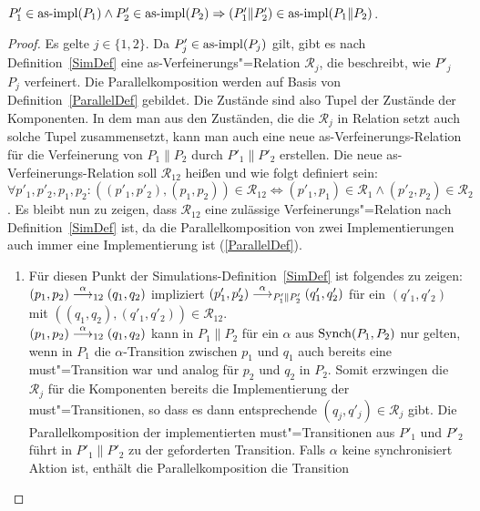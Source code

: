 \begin{Lem}\mbox{}\\
  \label{impParallelLem}
  $P'_1\in\mathrm{as}\text{-}\mathrm{impl} (P_1) \land P'_2 \in\mathrm{as}\text{-}\mathrm{impl} (P_2) \Rightarrow (P'_1\|P'_2)
  \in\mathrm{as}\text{-}\mathrm{impl} (P_1\|P_2)$.
\end{Lem}

\begin{proof}
  Es gelte $j\in\{1,2\}$. Da $P'_j\in\mathrm{as}\text{-}\mathrm{impl} (P_j)$ gilt, gibt es nach
  Definition~\ref{SimDef} eine as-Verfeinerungs"=Relation $\mathcal{R}_j$, die
  beschreibt, wie $P'_j$ $P_j$ verfeinert. Die Parallelkomposition werden
  auf Basis von Definition~\ref{ParallelDef} gebildet. Die Zustände sind also
  Tupel der Zustände der Komponenten. In dem man aus den Zuständen, die die
  $\mathcal{R}_j$ in Relation setzt auch solche Tupel zusammensetzt, kann man
  auch eine neue as-Verfeinerungs-Relation für die Verfeinerung von $P_1\|P_2$
  durch $P'_1\|P'_2$ erstellen. Die neue as-Verfeinerungs-Relation soll
  $\mathcal{R}_{12}$ heißen und wie folgt definiert sein:
  $\forall p'_1,p'_2,p_1,p_2: ((p'_1,p'_2),(p_1,p_2))\in\mathcal{R}_{12}
  \Leftrightarrow (p'_1,p_1)\in\mathcal{R}_1 \land (p'_2,p_2)\in\mathcal{R}_2$.
  Es bleibt nun zu zeigen, dass $\mathcal{R}_{12}$ eine zulässige
  Verfeinerungs"=Relation nach Definition~\ref{SimDef} ist, da die
  Parallelkomposition von zwei Implementierungen auch immer eine
  Implementierung ist (\ref{ParallelDef}).
  \begin{enumerate}
    \item Für diesen Punkt der Simulations-Definition~\ref{SimDef} ist
      folgendes zu zeigen: $(p_1,p_2)\must[\alpha]_{12}(q_1,q_2)$ impliziert
      $(p'_1,p'_2)\must[\alpha]_{P'_1\|P'_2}(q'_1,q'_2)$ für ein $(q'_1,q'_2)$
      mit $((q_1,q_2),(q'_1,q'_2))\in\mathcal{R}_{12}$.\\
      $(p_1,p_2)\must[\alpha]_{12}(q_1,q_2)$ kann in $P_1\|P_2$ für ein
      $\alpha$ aus $\mathrm{Synch} (P_1,P_2)$ nur gelten, wenn in $P_1$ die
      $\alpha$-Transition zwischen $p_1$ und $q_1$ auch bereits eine
      must"=Transition war und analog für $p_2$ und $q_2$ in $P_2$. Somit
      erzwingen die $\mathcal{R}_j$ für die Komponenten bereits die
      Implementierung der must"=Transitionen, so dass es dann entsprechende
      $(q_j,q'_j)\in\mathcal{R}_j$ gibt. Die Parallelkomposition der
      implementierten must"=Transitionen aus $P'_1$ und $P'_2$ führt in
      $P'_1\|P'_2$ zu der geforderten Transition. Falls $\alpha$ keine
      synchronisiert Aktion ist, enthält die Parallelkomposition die Transition

\end{enumerate}
\end{proof}
